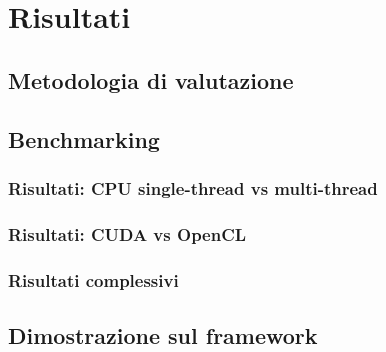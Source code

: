 \chapter{Risultati}
\label{ch:risultati}

\section{Metodologia di valutazione}
\label{sec:bencharmking}

\lipsum[1]

\section{Benchmarking}
\label{sec:benchmarking}

\lipsum[1]

\subsection{Risultati: CPU single-thread vs multi-thread}
\label{subsec:risultati-cpu}

\lipsum[1]

\subsection{Risultati: CUDA vs OpenCL}
\label{subsec:risultati-cuda-opencl}

\lipsum[1]

\subsection{Risultati complessivi}
\label{subsec:risultati-complessivi}

\lipsum[1]

\section{Dimostrazione sul framework}
\label{sec:dimostrazione}

\lipsum[1]